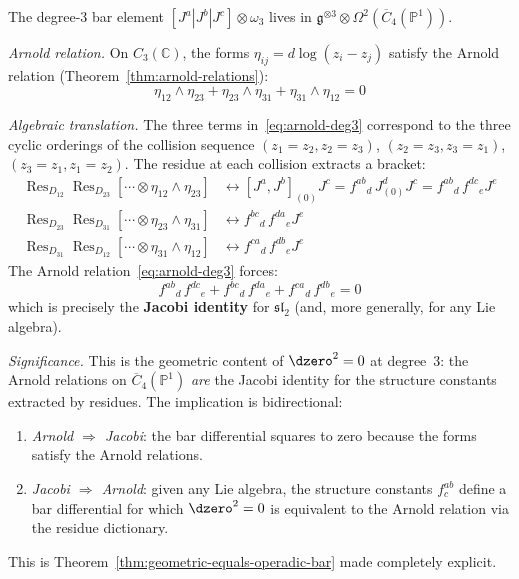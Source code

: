 \begin{computation}
\label{comp:geom-alg-comparison-deg3}

The degree-3 bar element
$[J^a|J^b|J^c] \otimes \omega_3$
lives in $\mathfrak{g}^{\otimes 3} \otimes
\Omega^2(\overline{C}_4(\mathbb{P}^1))$.

\emph{Arnold relation.}
On $C_3(\mathbb{C})$, the forms $\eta_{ij} = d\log(z_i - z_j)$
satisfy the Arnold relation
(Theorem~\ref{thm:arnold-relations}):
\begin{equation}\label{eq:arnold-deg3}
\eta_{12} \wedge \eta_{23} + \eta_{23} \wedge \eta_{31}
+ \eta_{31} \wedge \eta_{12} = 0
\end{equation}

\emph{Algebraic translation.}
The three terms in~\eqref{eq:arnold-deg3} correspond to the three
cyclic orderings of the collision sequence
$(z_1 = z_2, z_2 = z_3)$, $(z_2 = z_3, z_3 = z_1)$,
$(z_3 = z_1, z_1 = z_2)$.
The residue at each collision extracts a bracket:
\begin{align}
\operatorname{Res}_{D_{12}}\operatorname{Res}_{D_{23}}
[\cdots \otimes \eta_{12} \wedge \eta_{23}]
&\leftrightarrow [J^a, J^b]_{(0)} J^c
= {f^{ab}}_d\, J^d_{(0)} J^c
= {f^{ab}}_d\, {f^{dc}}_e J^e \\
\operatorname{Res}_{D_{23}}\operatorname{Res}_{D_{31}}
[\cdots \otimes \eta_{23} \wedge \eta_{31}]
&\leftrightarrow {f^{bc}}_d\, {f^{da}}_e J^e \\
\operatorname{Res}_{D_{31}}\operatorname{Res}_{D_{12}}
[\cdots \otimes \eta_{31} \wedge \eta_{12}]
&\leftrightarrow {f^{ca}}_d\, {f^{db}}_e J^e
\end{align}
The Arnold relation~\eqref{eq:arnold-deg3} forces:
\begin{equation}\label{eq:jacobi-from-arnold}
{f^{ab}}_d\, {f^{dc}}_e + {f^{bc}}_d\, {f^{da}}_e
+ {f^{ca}}_d\, {f^{db}}_e = 0
\end{equation}
which is precisely the \textbf{Jacobi identity} for
$\mathfrak{sl}_2$ (and, more generally, for any Lie algebra).

\emph{Significance.}
This is the geometric content of $\dzero^2 = 0$ at degree~3:
the Arnold relations on
$\overline{C}_4(\mathbb{P}^1)$ \emph{are} the Jacobi identity
for the structure constants extracted by residues.  The
implication is bidirectional:
\begin{enumerate}
\item \emph{Arnold $\Rightarrow$ Jacobi}: the bar differential
  squares to zero because the forms satisfy the Arnold relations.
\item \emph{Jacobi $\Rightarrow$ Arnold}: given any Lie algebra,
  the structure constants $f^{ab}_c$ define a bar differential
  for which $\dzero^2 = 0$ is equivalent to the Arnold relation via
  the residue dictionary.
\end{enumerate}
This is Theorem~\ref{thm:geometric-equals-operadic-bar} made
completely explicit.
\end{computation}

